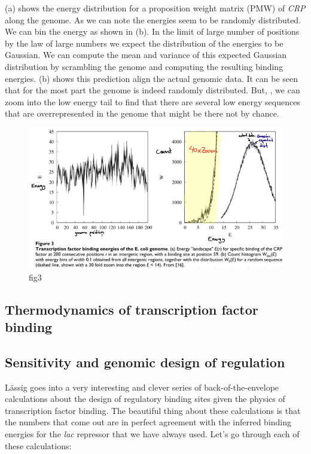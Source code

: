 (a) shows the energy distribution for a proposition
weight matrix (PMW) of {\it CRP} along the genome. As we can note the energies
seem to be randomly distributed. We can bin the energy as shown in
(b). In the limit of large number of positions by the
law of large numbers we expect the distribution of the energies to be Gaussian.
We can compute the mean and variance of this expected Gaussian distribution by
scrambling the genome and computing the resulting binding energies.
(b) shows this prediction align the actual genomic
data. It can be seen that for the most part the genome is indeed randomly
distributed. But, , we
can zoom into the low energy tail to find that there are several low energy
sequences that are overrepresented in the genome that might be there not by
chance.

\begin{figure}[h!]
	\centering \includegraphics[scale=0.5]{../fig/lassig_2007/fig3.png}
	\caption{fig3}
  \label{fig_tf_binding_ecoli}
\end{figure}

\subsection{Thermodynamics of transcription factor binding}

\subsection{Sensitivity and genomic design of regulation}
L\"{a}ssig goes into a very interesting and clever series of back-of-the-envelope
calculations about the design of regulatory binding sites given the physics of
transcription factor binding. The beautiful thing about these calculations is
that the numbers that come out are in perfect agreement with the inferred
binding energies for the {\it lac} repressor that we have always used. Let's go
through each of these calculations:

